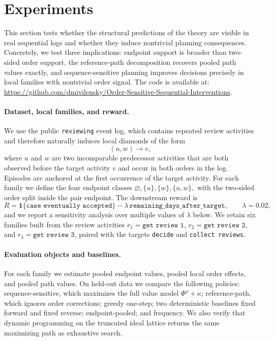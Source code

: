 \documentclass{article}
\theoremstyle{definition}
\begin{document}
\section{Experiments}
\label{sec:experiments}

\begingroup
\setlength{\textfloatsep}{6pt plus 1pt minus 2pt}
\setlength{\floatsep}{5pt plus 1pt minus 2pt}
\setlength{\intextsep}{5pt plus 1pt minus 2pt}
\setlength{\abovecaptionskip}{3pt}
\setlength{\belowcaptionskip}{-2pt}
\setlength{\tabcolsep}{4pt}
\renewcommand{\arraystretch}{0.96}

This section tests whether the structural predictions of the theory are visible in real sequential logs and whether they induce nontrivial planning consequences. Concretely, we test three implications: endpoint support is broader than two-sided order support, the reference-path decomposition recovers pooled path values exactly, and sequence-sensitive planning improves decisions precisely in local families with nontrivial order signal. The code is available at: \url{https://github.com/dmivilensky/Order-Sensitive-Sequential-Interventions}.

\paragraph{Dataset, local families, and reward.}
We use the public \texttt{reviewing} event log, which contains repeated review activities and therefore naturally induces local diamonds of the form
\[
(u,w)\to v,
\]
where $u$ and $w$ are two incomparable predecessor activities that are both observed before the target activity $v$ and occur in both orders in the log. Episodes are anchored at the first occurrence of the target activity. For each family we define the four endpoint classes
$
\varnothing, \{u\}, \{w\}, \{u,w\},
$
with the two-sided order split inside the pair endpoint. The downstream reward is
\[
R
=
\mathbf 1\{\texttt{case eventually accepted}\}
-\lambda\,\texttt{remaining\_days\_after\_target},
\qquad
\lambda=0.02,
\]
and we report a sensitivity analysis over multiple values of $\lambda$ below. We retain six families built from the review activities $r_1=\texttt{get review 1}$, $r_2=\texttt{get review 2}$, and $r_3=\texttt{get review 3}$, paired with the targets \texttt{decide} and \texttt{collect reviews}.

\paragraph{Evaluation objects and baselines.}
For each family we estimate pooled endpoint values, pooled local order effects, and pooled path values. On held-out data we compare the following policies: {sequence-sensitive}, which maximizes the full value model $\Phi^{\rho}+\kappa$; {reference-path}, which ignores order corrections; {greedy one-step}; two deterministic baselines {fixed forward} and {fixed reverse}; {endpoint-pooled}; and {frequency}. We also verify that dynamic programming on the truncated ideal lattice returns the same maximizing path as exhaustive search.
\end{document}
